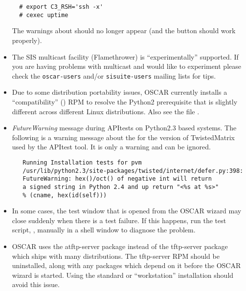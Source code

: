 \begin{itemize}
\begin{verbatim}
  # export C3_RSH='ssh -x'
  # cexec uptime
\end{verbatim}

  The warnings about  should no longer appear (and the
   button should work properly).

\item The SIS multicast facility (Flamethrower) is ``experimentally''
  supported.  If you are having problems with multicast and would like
  to experiment please check the {\tt oscar-users} and/or
  {\tt sisuite-users} mailing lists for tips.

\item Due to some distribution portability issues, OSCAR currently installs
  a ``compatibility''  () RPM to resolve the
  Python2 prerequisite that is slightly different across different Linux
  distributions.  Also see the file .

\item \emph{FutureWarning} message during APItests on Python2.3 based systems.
   The following is a warning message about the for the version of
   TwistedMatrix used by the APItest tool.  It is only a warning and can be
   ignored.
   \begin{small}
   \begin{verbatim}
   Running Installation tests for pvm
   /usr/lib/python2.3/site-packages/twisted/internet/defer.py:398:
   FutureWarning: hex()/oct() of negative int will return
   a signed string in Python 2.4 and up return "<%s at %s>" 
   % (cname, hex(id(self)))
   \end{verbatim}
   \end{small}

\item In some cases, the test window that is opened from the
  OSCAR wizard may close suddenly when there is a test failure. If
  this happens, run the test script, ,
  manually in a shell window to diagnose the problem.

\item OSCAR uses the atftp-server package instead of the tftp-server
  package which ships with many distributions.  The tftp-server RPM 
  should be uninstalled, along with any packages which depend on it
  before the OSCAR wizard is started.  Using the standard or
  ``workstation'' installation should avoid this issue.


\end{itemize}

